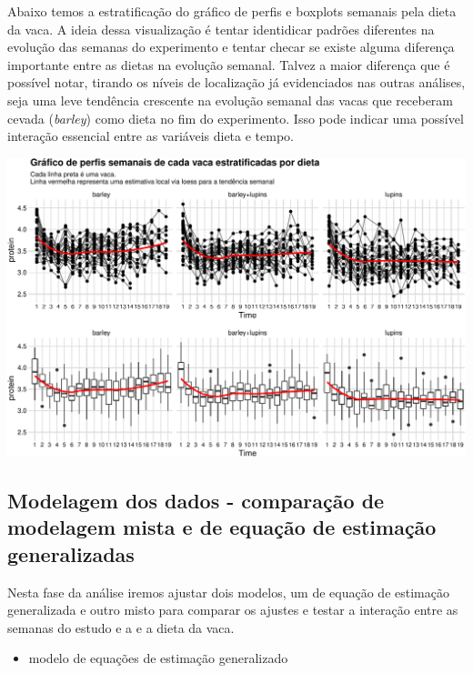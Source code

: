\documentclass[
  11pt,
]{article}
\providecommand{\tightlist}{%
  \setlength{\itemsep}{0pt}\setlength{\parskip}{0pt}}
\begin{document}
Abaixo temos a estratificação do gráfico de perfis e boxplots semanais pela dieta da vaca. A ideia dessa visualização é tentar identidicar padrões diferentes na evolução das semanas do experimento e tentar checar se existe alguma diferença importante entre as dietas na evolução semanal. Talvez a maior diferença que é possível notar, tirando os níveis de localização já evidenciados nas outras análises, seja uma leve tendência crescente na evolução semanal das vacas que receberam cevada (\emph{barley}) como dieta no fim do experimento. Isso pode indicar uma possível interação essencial entre as variáveis dieta e tempo.

\begin{center}\includegraphics{lista3_files/figure-latex/unnamed-chunk-25-1} \end{center}

\hypertarget{modelagem-dos-dados---comparauxe7uxe3o-de-modelagem-mista-e-de-equauxe7uxe3o-de-estimauxe7uxe3o-generalizadas}{%
\subsection{Modelagem dos dados - comparação de modelagem mista e de equação de estimação generalizadas}\label{modelagem-dos-dados---comparauxe7uxe3o-de-modelagem-mista-e-de-equauxe7uxe3o-de-estimauxe7uxe3o-generalizadas}}

Nesta fase da análise iremos ajustar dois modelos, um de equação de estimação generalizada e outro misto para comparar os ajustes e testar a interação entre as semanas do estudo e a e a dieta da vaca.

\begin{itemize}
\tightlist
\item
  modelo de equações de estimação generalizado
\end{itemize}
\end{document}
